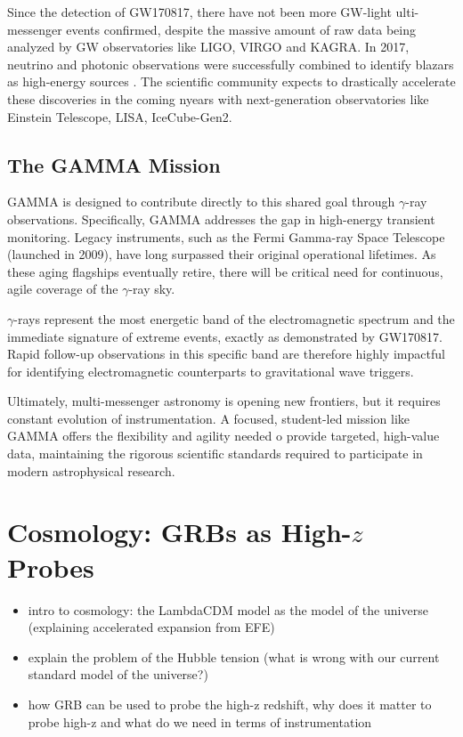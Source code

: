 \documentclass[
    aps,
    prd,
    twocolumn,
    nofootinbib,
    floatfix,
    superscriptaddress
]{revtex4-2}
\begin{document}
Since the detection of GW170817, there have not been more GW-light ulti-messenger events confirmed, despite the massive amount of raw data being analyzed by GW observatories like LIGO, VIRGO and KAGRA. In 2017, neutrino and photonic observations were successfully combined to identify blazars as high-energy sources \cite{IceCube2018Multimessenger}. The scientific community expects to drastically accelerate these discoveries in the coming nyears with next-generation observatories like Einstein Telescope, LISA, IceCube-Gen2.


\subsection{The GAMMA Mission}
GAMMA is designed to contribute directly to this shared goal through $\gamma$-ray observations. Specifically, GAMMA addresses the gap in high-energy transient monitoring. Legacy instruments, such as the Fermi Gamma-ray Space Telescope (launched in 2009), have long surpassed their original operational lifetimes. As these aging flagships eventually retire, there will be critical need for continuous, agile coverage of the $\gamma$-ray sky.

$\gamma$-rays represent the most energetic band of the electromagnetic spectrum and the immediate signature of extreme events, exactly as demonstrated by GW170817. Rapid follow-up observations in this specific band are therefore highly impactful for identifying electromagnetic counterparts to gravitational wave triggers.

Ultimately, multi-messenger astronomy is opening new frontiers, but it requires constant evolution of instrumentation. A focused, student-led mission like GAMMA offers the flexibility and agility needed o provide targeted, high-value data, maintaining the rigorous scientific standards required to participate in modern astrophysical research.
\section{Cosmology: GRBs as High-$z$ Probes}


\begin{itemize}
	\item intro to cosmology: the LambdaCDM model as the model of the universe (explaining accelerated expansion from EFE)
	\item explain the problem of the Hubble tension (what is wrong with our current standard model of the universe?)
	\item how GRB can be used to probe the high-z redshift, why does it matter to probe high-z and what do we need in terms of instrumentation
\end{itemize}
\end{document}
